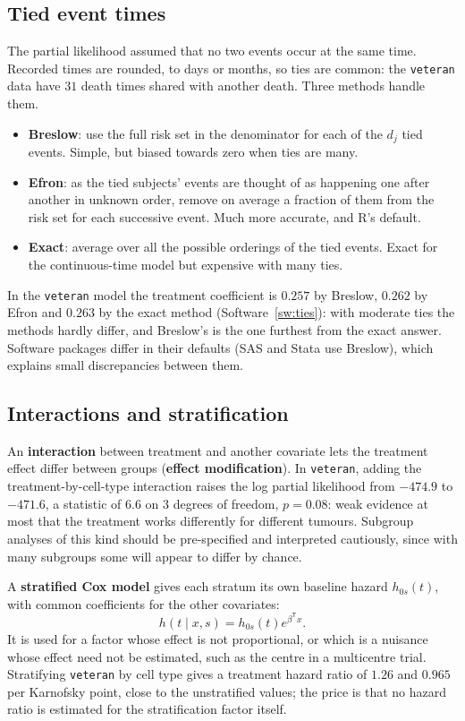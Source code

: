 \documentclass[11pt,a4paper]{article}
\numberwithin{equation}{section}
\theoremstyle{definition}
\begin{document}
\subsection{Tied event times}
\label{ssec:ties}

The partial likelihood assumed that no two events occur at the same time. Recorded times are rounded, to days or months, so ties are common: the \texttt{veteran} data have $31$ death times shared with another death. Three methods handle them.
\begin{itemize}
\item \textbf{Breslow}: use the full risk set in the denominator for each of the $d_j$ tied events. Simple, but biased towards zero when ties are many.
\item \textbf{Efron}: as the tied subjects' events are thought of as happening one after another in unknown order, remove on average a fraction of them from the risk set for each successive event. Much more accurate, and R's default.
\item \textbf{Exact}: average over all the possible orderings of the tied events. Exact for the continuous-time model but expensive with many ties.
\end{itemize}
In the \texttt{veteran} model the treatment coefficient is $0.257$ by Breslow, $0.262$ by Efron and $0.263$ by the exact method (Software~\ref{sw:ties}): with moderate ties the methods hardly differ, and Breslow's is the one furthest from the exact answer. Software packages differ in their defaults (SAS and Stata use Breslow), which explains small discrepancies between them.

\subsection{Interactions and stratification}
\label{ssec:interactions}

An \textbf{interaction} between treatment and another covariate lets the treatment effect differ between groups (\textbf{effect modification}). In \texttt{veteran}, adding the treatment-by-cell-type interaction raises the log partial likelihood from $-474.9$ to $-471.6$, a statistic of $6.6$ on $3$ degrees of freedom, $p = 0.08$: weak evidence at most that the treatment
works differently for different tumours. Subgroup analyses of this kind should be pre-specified and interpreted cautiously, since with many subgroups some will appear to differ by chance.

A \textbf{stratified Cox model} gives each stratum its own baseline hazard $h_{0s}(t)$, with common coefficients for the other covariates:
\[
h(t \mid x, s) = h_{0s}(t)e^{\beta^{\mathsf T}x} .
\]
It is used for a factor whose effect is not proportional, or which is a nuisance whose effect need not be estimated, such as the centre in a multicentre trial. Stratifying \texttt{veteran} by cell type gives a treatment hazard ratio of $1.26$ and $0.965$ per Karnofsky point, close to the unstratified values; the price is that no hazard ratio is estimated for the stratification
factor itself.
\end{document}
